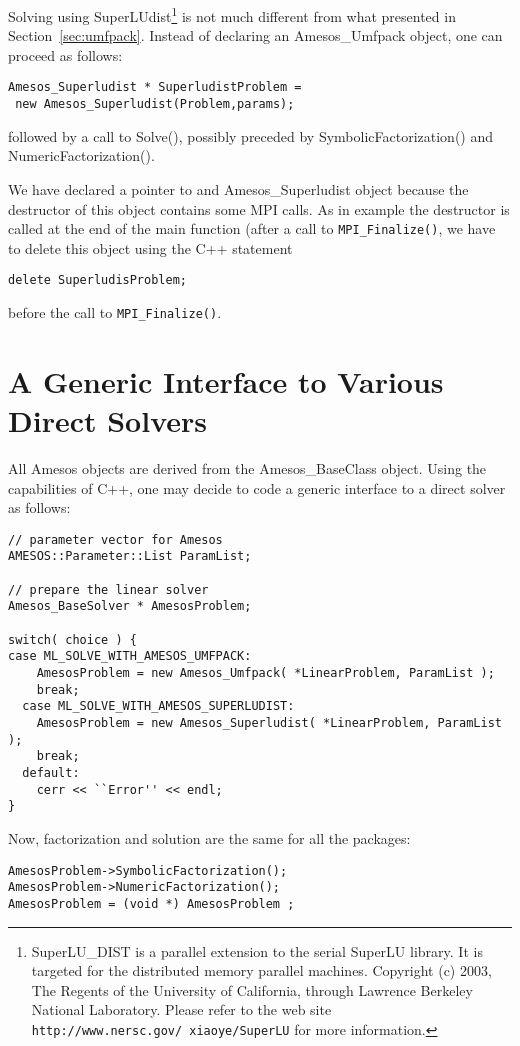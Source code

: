 Solving using SuperLUdist\footnote{SuperLU\_DIST is a parallel extension
  to the  serial SuperLU library.   It  is targeted for the  distributed
  memory parallel  machines. 
Copyright (c) 2003, The Regents of the University of California, through
Lawrence Berkeley National Laboratory.
Please refer
  to  the  web site {\tt  http://www.nersc.gov/~xiaoye/SuperLU} for more
  information.}  is not   much  different    from  what presented     in
Section~\ref{sec:umfpack}.    Instead of   declaring  an Amesos\_Umfpack
object, one can proceed as follows:
\begin{verbatim}
Amesos_Superludist * SuperludistProblem = 
 new Amesos_Superludist(Problem,params);
\end{verbatim}
followed by a call to Solve(), possibly preceded by
SymbolicFactorization() and NumericFactorization().

\begin{remark}
  We have declared a pointer to and Amesos\_Superludist object because
  the destructor of this object contains some MPI
  calls. As in example  the destructor is called
  at the end of the main function (after a call to
  \verb!MPI_Finalize()!, we have to delete this object using the C++
  statement
\begin{verbatim}
delete SuperludisProblem;
\end{verbatim}
  before the call to \verb!MPI_Finalize()!.
\end{remark}


\section{A Generic Interface to Various Direct Solvers}
\label{sec:amesos_generic}

All Amesos objects are derived from the Amesos\_BaseClass object. Using
the capabilities of C++, one may decide to code a generic interface to a
direct solver as follows:
\begin{verbatim}
// parameter vector for Amesos
AMESOS::Parameter::List ParamList;

// prepare the linear solver
Amesos_BaseSolver * AmesosProblem;

switch( choice ) {
case ML_SOLVE_WITH_AMESOS_UMFPACK:
    AmesosProblem = new Amesos_Umfpack( *LinearProblem, ParamList );
    break;
  case ML_SOLVE_WITH_AMESOS_SUPERLUDIST:
    AmesosProblem = new Amesos_Superludist( *LinearProblem, ParamList );
    break;
  default:
    cerr << ``Error'' << endl;
}
\end{verbatim}

Now, factorization and solution are the same for all the packages:
\begin{verbatim}  
AmesosProblem->SymbolicFactorization();
AmesosProblem->NumericFactorization();
AmesosProblem = (void *) AmesosProblem ;
\end{verbatim}



